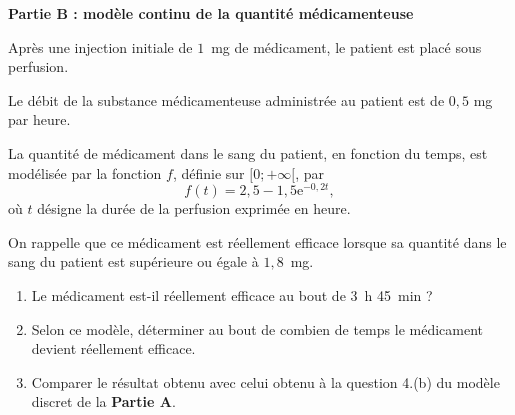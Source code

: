 \textbf{Partie B : modèle continu de la quantité médicamenteuse}

\medskip

Après une injection initiale de $1$~mg de médicament, le patient est placé sous perfusion.

Le débit de la substance médicamenteuse administrée au patient est de $0,5$ mg par heure.

La quantité de médicament dans le sang du patient, en fonction du temps, est modélisée
par la fonction $f$, définie sur $[0;+\infty[$, par \[f(t) = 2,5 - 1,5\text{e}^{-0,2t},\]%
%
où $t$ désigne la durée de la perfusion exprimée en heure.

On rappelle que ce médicament est réellement efficace lorsque sa quantité dans le sang du patient est supérieure ou égale à $1,8$~mg.

\begin{enumerate}
	\item Le médicament est-il réellement efficace au bout de 3~h 45~min ?
	\item Selon ce modèle, déterminer au bout de combien de temps le médicament devient réellement efficace.
	\item Comparer le résultat obtenu avec celui obtenu à la question 4.(b) du modèle discret de la \textbf{Partie A}.
\end{enumerate}

